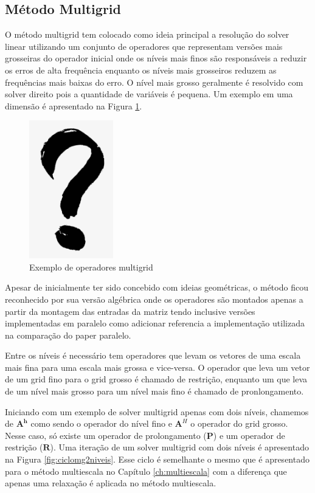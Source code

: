\subsection{Método Multigrid}

O método multigrid tem colocado como ideia principal a resolução do solver linear utilizando um conjunto de operadores que representam versões mais grosseiras do operador inicial onde os níveis mais finos são responsáveis a reduzir os erros de alta frequência enquanto os níveis mais grosseiros reduzem as frequências mais baixas do erro. O nível mais grosso geralmente é resolvido com solver direito pois a quantidade de variáveis é pequena. Um exemplo em uma dimensão é apresentado na Figura \ref{fig:exemplomultigrid}. 


\begin{figure}[!htbp]
\centering
\includegraphics[height=6cm]{interrogacao.png}
\caption{Exemplo de operadores multigrid}
\label{fig:exemplomultigrid}
\end{figure}


Apesar de inicialmente ter sido concebido com ideias geométricas, o método ficou reconhecido por sua versão algébrica onde os operadores são montados apenas a partir da montagem das entradas da matriz tendo inclusive versões implementadas em paralelo como {\color{red} adicionar referencia a implementação utilizada na comparação do paper paralelo}.  


Entre os níveis é necessário tem operadores que levam os vetores de uma escala mais fina para uma escala mais grossa e vice-versa. O operador que leva um vetor de um grid fino para o grid grosso é chamado de restrição, enquanto um que leva de um nível mais grosso para um nível mais fino é chamado de pronlongamento. 


Iniciando com um exemplo de solver multigrid apenas com dois níveis, chamemos de $\mathbf{A^h}$ como sendo o operador do nível fino e $\mathbf{A}^H$ o operador do grid grosso. Nesse caso, só existe um operador de prolongamento ($\mathbf{P}$) e um operador de restrição ($\mathbf{R}$). Uma iteração de um solver multigrid com dois níveis é apresentado na Figura \ref{fig:ciclomg2niveis}. Esse ciclo é semelhante o mesmo que é apresentado para o método multiescala no Capítulo \ref{ch:multiescala} com a diferença que apenas uma relaxação é aplicada no método multiescala.


